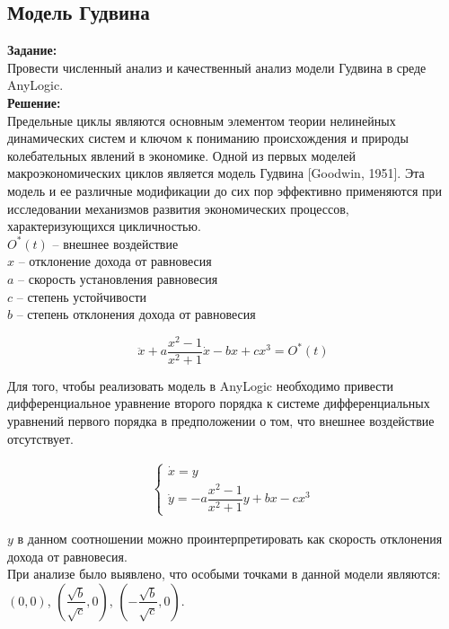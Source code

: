 \subsection*{Модель Гудвина}

\textbf{Задание:}\\
Провести численный анализ и качественный анализ модели Гудвина в среде AnyLogic.\\

\textbf{Решение:}\\
Предельные циклы являются основным элементом теории нелинейных динамических систем и ключом к пониманию происхождения и природы колебательных явлений в экономике. Одной из первых моделей макроэкономических циклов является модель Гудвина [Goodwin, 1951]. Эта модель и ее различные модификации до сих пор эффективно применяются при исследовании механизмов развития экономических процессов, характеризующихся цикличностью.\\

$O^*(t)$ -- внешнее воздействие\\
$x$ -- отклонение дохода от равновесия\\
$a$ -- скорость установления равновесия\\
$c$ -- степень устойчивости\\
$b$ -- степень отклонения дохода от равновесия

\[ \ddot{x} + a \dfrac{x^2 - 1}{x^2 + 1} \dot{x} - b x + c x^3 = O^*(t) \]

Для того, чтобы реализовать модель в AnyLogic необходимо привести дифференциальное уравнение второго порядка к системе дифференциальных уравнений первого порядка в предположении о том, что внешнее воздействие отсутствует.

\begin{align*}
	\begin{cases}
		\dot{x} = y\\
		\dot{y} = -a \dfrac{x^2 - 1}{x^2 + 1} y + bx - cx^3
	\end{cases}
\end{align*}

$y$ в данном соотношении можно проинтерпретировать как скорость отклонения дохода от равновесия.\\

При анализе было выявлено, что особыми точками в данной модели являются: $(0,0)$, $\left(\dfrac{\sqrt{b}}{\sqrt{c}},0\right)$, $\left(-\dfrac{\sqrt{b}}{\sqrt{c}},0\right)$.\\

